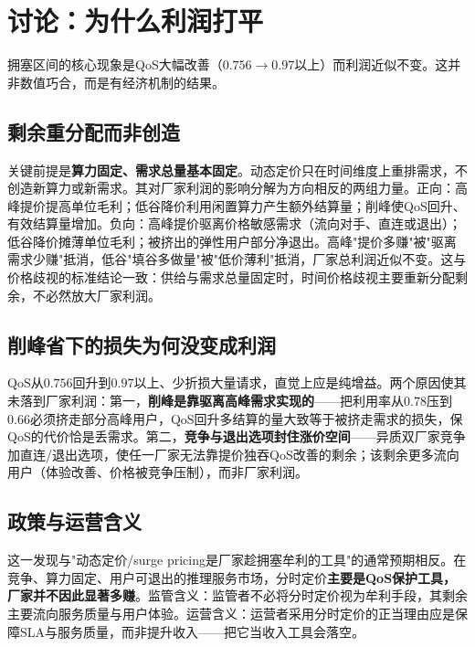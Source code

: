 \documentclass[UTF8,11pt]{ctexart}
\begin{document}
\section{讨论：为什么利润打平}
\label{sec:discussion}

拥塞区间的核心现象是QoS大幅改善（$0.756\to0.97$以上）而利润近似不变。这并非数值巧合，而是有经济机制的结果。

\subsection{剩余重分配而非创造}

关键前提是\textbf{算力固定、需求总量基本固定}。动态定价只在时间维度上重排需求，不创造新算力或新需求。其对厂家利润的影响分解为方向相反的两组力量。正向：高峰提价提高单位毛利；低谷降价利用闲置算力产生额外结算量；削峰使QoS回升、有效结算量增加。负向：高峰提价驱离价格敏感需求（流向对手、直连或退出）；低谷降价摊薄单位毛利；被挤出的弹性用户部分净退出。高峰"提价多赚"被"驱离需求少赚"抵消，低谷"填谷多做量"被"低价薄利"抵消，厂家总利润近似不变。这与价格歧视的标准结论一致：供给与需求总量固定时，时间价格歧视主要重新分配剩余，不必然放大厂家利润。

\subsection{削峰省下的损失为何没变成利润}

QoS从$0.756$回升到$0.97$以上、少折损大量请求，直觉上应是纯增益。两个原因使其未落到厂家利润：第一，\textbf{削峰是靠驱离高峰需求实现的}——把利用率从$0.78$压到$0.66$必须挤走部分高峰用户，QoS回升多结算的量大致等于被挤走需求的损失，保QoS的代价恰是丢需求。第二，\textbf{竞争与退出选项封住涨价空间}——异质双厂家竞争加直连/退出选项，使任一厂家无法靠提价独吞QoS改善的剩余；该剩余更多流向用户（体验改善、价格被竞争压制），而非厂家利润。

\subsection{政策与运营含义}

这一发现与"动态定价/surge pricing是厂家趁拥塞牟利的工具"的通常预期相反。在竞争、算力固定、用户可退出的推理服务市场，分时定价\textbf{主要是QoS保护工具，厂家并不因此显著多赚}。监管含义：监管者不必将分时定价视为牟利手段，其剩余主要流向服务质量与用户体验。运营含义：运营者采用分时定价的正当理由应是保障SLA与服务质量，而非提升收入——把它当收入工具会落空。
\end{document}
